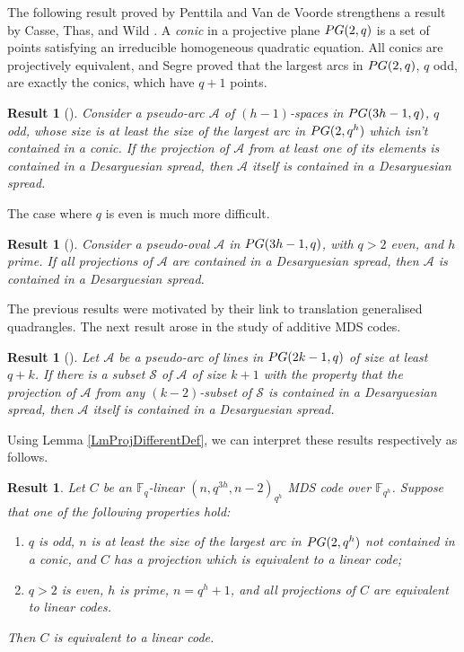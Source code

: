 \documentclass[a4paper]{article}
\newtheorem{res}[thm]{Result}
\theoremstyle{definition}
\newcommand{\FF}{\mathbb F}
\newcommand{\pg}{\textnormal{PG}}
\newcommand{\ma}{\mathcal A}
\begin{document}
The following result proved by Penttila and Van de Voorde \cite{penttilavandevoorde} strengthens a result by Casse, Thas, and Wild \cite{cassethaswild}.
A \emph{conic} in a projective plane $\pg(2,q)$ is a set of points satisfying an irreducible homogeneous quadratic equation.
All conics are projectively equivalent, and Segre \cite{segre55} proved that the largest arcs in $\pg(2,q)$, $q$ odd, are exactly the conics, which have $q+1$ points.


\begin{res}[{\cite{penttilavandevoorde}}]
 Consider a pseudo-arc $\ma$ of $(h-1)$-spaces in $\pg(3h-1,q)$, $q$ odd, whose size is at least the size of the largest arc in $\pg(2,q^h)$ which isn't contained in a conic.
 If the projection of $\ma$ from at least one of its elements is contained in a Desarguesian spread, then $\ma$ itself is contained in a Desarguesian spread.
\end{res}

The case where $q$ is even is much more difficult.

\begin{res}[{\cite{rotteyvandevoorde,thas19}}]
 Consider a pseudo-oval $\ma$ in $\pg(3h-1,q)$, with $q>2$ even, and $h$ prime.
 If all projections of $\ma$ are contained in a Desarguesian spread, then $\ma$ is contained in a Desarguesian spread.
\end{res}

The previous results were motivated by their link to translation generalised quadrangles.
The next result arose in the study of additive MDS codes.

\begin{res}[{\cite{gamboa}}]
Let $\ma$ be a pseudo-arc of lines in $\pg(2k-1,q)$ of size at least $q+k$.
If there is a subset $\mathcal S$ of $\ma$ of size $k+1$ with the property that the projection of $\ma$ from any $(k-2)$-subset of $\mathcal S$ is contained in a Desarguesian spread, then $\ma$ itself is contained in a Desarguesian spread.
\end{res}

Using Lemma \ref{LmProjDifferentDef}, we can interpret these results respectively as follows.

\begin{res}
Let $C$ be an $\FF_q$-linear $(n,q^{3h},n-2)_{q^h}$ MDS code over $\FF_{q^h}$.
Suppose that one of the following properties hold:
\begin{enumerate}
 \item \textnormal{\cite{penttilavandevoorde}} $q$ is odd, $n$ is at least the size of the largest arc in $\pg(2,q^h)$ not contained in a conic, and $C$ has a projection which is equivalent to a linear code;
 \item \textnormal{\cite{rotteyvandevoorde,thas19}} $q>2$ is even, $h$ is prime, $n=q^h+1$, and all projections of $C$ are equivalent to linear codes.
\end{enumerate}
Then $C$ is equivalent to a linear code.
\end{res}
\end{document}
